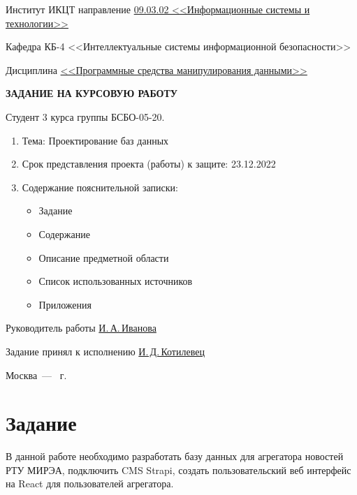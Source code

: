 \documentclass{mirea}
\begin{document}
\begin{titlepage}
		Институт ИКЦТ направление \underline{09.03.02 <<Информационные системы и технологии>>}
		
		Кафедра КБ-4 <<Интеллектуальные системы информационной безопасности>>
		
		Дисциплина \underline{<<Программные средства манипулирования данными>>}
		
		\begin{center}
			\vspace*{1cm}
			{\fontsize{16pt}{16pt}\selectfont
				\textbf{ЗАДАНИЕ НА КУРСОВУЮ РАБОТУ}} \par
		\end{center}
	
		Студент 3 курса группы БСБО-05-20.
		
		\begin{enumerate}
			\item Тема: Проектирование баз данных
			\item Срок представления проекта (работы) к защите: 23.12.2022
			\item Содержание пояснительной записки:
			\begin{itemize}
				\item Задание
				\item Содержание
				\item Описание предметной области
				\item Список использованных источников
				\item Приложения
			\end{itemize}
		\end{enumerate}
	
		Руководитель работы \underline{И.\,А.\,Иванова}
		
		Задание принял к исполнению \underline{И.\,Д.\,Котилевец}
		
		\begin{center}
			\vfill Москва~--- \the\year{}~г.
		\end{center}
	\end{titlepage}
	\addtocounter{page}{3}
	
	
	\tableofcontents
	
	\section*{Задание}
	
	В данной работе необходимо разработать базу данных для агрегатора новостей РТУ МИРЭА, подключить CMS Strapi, создать пользовательский веб интерфейс на React для пользователей агрегатора.
	
\end{document}
